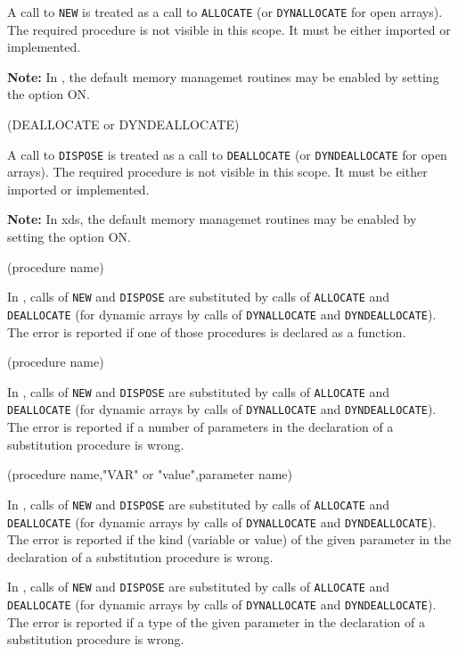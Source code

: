 A call to \verb'NEW' is treated as a call to \verb'ALLOCATE'
(or \verb'DYNALLOCATE' for open arrays).
The required procedure is not visible in this scope.
It must be either imported or implemented.

{\bf Note:} In \xds{}, the default memory managemet routines
may be enabled by setting the  option ON.

(DEALLOCATE or DYNDEALLOCATE)

A call to \verb'DISPOSE' is treated as a call to \verb'DEALLOCATE'
(or \verb'DYNDEALLOCATE' for open arrays).
The required procedure is not visible in this scope.
It must be either imported or implemented.

{\bf Note:} In xds{}, the default memory managemet routines
may be enabled by setting the  option ON.

(procedure name)

In \mt{}, calls of \verb'NEW' and \verb'DISPOSE' are substituted by calls of
\verb'ALLOCATE' and \verb'DEALLOCATE' (for dynamic arrays by calls of
\verb'DYNALLOCATE' and \verb'DYNDEALLOCATE').
The error is reported if one of those procedures is declared as a function.

(procedure name)

In \mt{}, calls of \verb'NEW' and \verb'DISPOSE' are substituted by calls of
\verb'ALLOCATE' and \verb'DEALLOCATE' (for dynamic arrays by calls of
\verb'DYNALLOCATE' and \verb'DYNDEALLOCATE').
The error is reported if a number of parameters
in the declaration of a substitution procedure is wrong.

(procedure name,"VAR" or "value",parameter name)

In \mt{}, calls of \verb'NEW' and \verb'DISPOSE' are substituted by calls of
\verb'ALLOCATE' and \verb'DEALLOCATE' (for dynamic arrays by calls of
\verb'DYNALLOCATE' and \verb'DYNDEALLOCATE').
The error is reported if the kind (variable or value) of
the given parameter in the declaration of a substitution procedure is
wrong.


In \mt{}, calls of \verb'NEW' and \verb'DISPOSE' are substituted by calls of
\verb'ALLOCATE' and \verb'DEALLOCATE' (for dynamic arrays by calls of
\verb'DYNALLOCATE' and \verb'DYNDEALLOCATE').
The error is reported if a type of the given parameter in the
declaration of a substitution procedure is wrong.

